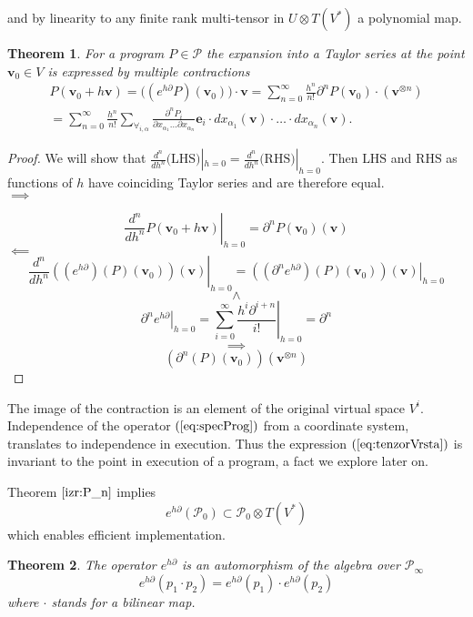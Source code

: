 \documentclass{article}
\newcommand{\e}{\mathbf{e}}
\newcommand{\vv}{\mathbf{v}}
\newcommand{\dP}{\mathcal{P}}
\newcommand{\D}{\partial}
\newtheorem{izrek}{Theorem}[section]
\begin{document}
and by linearity to any finite rank multi-tensor in $U\otimes T(V^*)$ a
polynomial map.
 
\begin{izrek}\label{izr:e^d}
	For a program $P\in\dP$  the expansion into a Taylor series
  at the point $\vv_0\in V$ is expressed by multiple contractions 
	\begin{multline}\label{eq:tenzorVrsta}
	P(\vv_0+h\vv) = \Big((e^{h\D}P)(\vv_0)\Big)\cdot\vv
  = \sum_{n=0}^\infty\frac{h^n}{n!}\D^nP(\vv_0)\cdot (\vv^{\otimes n})\\
  = \sum_{n=0}^\infty \frac{h^n}{n!}\sum_{\forall_{i,\alpha}}\frac{\partial^nP_i}{\partial
 		    x_{\alpha_1}\ldots \partial x_{\alpha_n}}\e_i\cdot
 		  dx_{\alpha_1}(\vv)\cdot\ldots \cdot dx_{\alpha_n}(\vv).
	\end{multline}
\end{izrek}
 
 \begin{proof}
We will show that $\frac{d^n}{dh^n}\text{(LHS)}|_{h=0}=\frac{d^n}{dh^n}\text{(RHS)}|_{h=0}$. Then $\text{LHS}$ and $\text{RHS}$ as functions
of $h$ have coinciding Taylor series and are therefore equal.\\
 $\implies$
 
 $$\left. \frac{d^n}{dh^n}P(\vv_0+h\vv)\right|_{h=0}=\D^n P(\vv_0)(\vv)$$
 $\impliedby$
 $$\left. \frac{d^n}{dh^n}\left((e^{h\D})(P)(\vv_0)\right)(\vv)\right|_{h=0}=
\left. \left((\D^n e^{h\D})(P)(\vv_0)\right)(\vv)\right|_{h=0}$$
 $$\land$$
 $$\left. \D^ne^{h\D}\right| _{h=0}=\left. \sum\limits_{i=0}^{\infty}\frac{h^i\D^{i+n}}{i!}\right|_{h=0}=\D^n$$
 $$\implies$$
 $$\left(\D^n(P)(\vv_0)\right)(\vv^{\otimes n})$$
 \end{proof}
 
 The image of the contraction is an element of the original virtual space $V^i$. Independence of the operator $(\ref{eq:specProg})$ from a coordinate system, translates to independence in execution. Thus the expression $(\ref{eq:tenzorVrsta})$ is invariant to the point in execution of a program, a fact we explore later on.  
 
 Theorem $\ref{izr:P_n}$ implies
     \begin{equation}
     	e^{h\D}(\dP_0)\subset\dP_0\otimes T(V^*)
     \end{equation}      
which enables efficient implementation.
 
 \begin{izrek}\label{izr:prod}
 The operator $e^{h\D}$ is an automorphism of the algebra over $\dP_\infty$
 \begin{equation}
 	e^{h\D}(p_1\cdot p_2)=e^{h\D}(p_1)\cdot e^{h\D}(p_2)
 \end{equation}
 where $\cdot$ stands for a bilinear map.
 \end{izrek}
 
\end{document}
